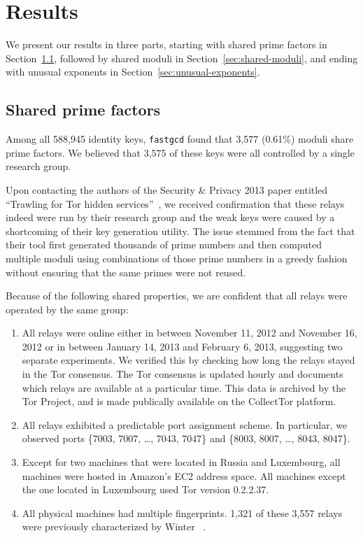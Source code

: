 \section{Results}
\label{sec:results}
We present our results in three parts, starting with shared prime factors in
Section~\ref{sec:shared-primes}, followed by shared moduli in
Section~\ref{sec:shared-moduli}, and ending with unusual exponents 
in Section~\ref{sec:unusual-exponents}.

\subsection{Shared prime factors}
\label{sec:shared-primes}
Among all 588,945 identity keys, \texttt{fastgcd} found that 3,577 (0.61\%) 
moduli share prime factors.  We believed that 3,575 of these keys 
were all controlled by a single research group.  

Upon contacting the authors of the Security \& Privacy 2013 paper entitled
``Trawling for Tor hidden services''~\cite{Biryukov2013a}, we received
confirmation that these relays indeed were run by their research group and the
weak keys were caused by a shortcoming of their key generation utility. The
issue stemmed from the fact that their tool first generated thousands of prime
numbers and then computed multiple moduli using combinations of those prime
numbers in a greedy fashion without ensuring that the same primes were not
reused.

Because of the following shared properties, we are confident that all relays
were operated by the same group:

\begin{enumerate}
	\item All relays were online either in between November 11, 2012 and
		November 16, 2012 or in between January 14, 2013 and February 6, 2013,
		suggesting two separate experiments. We verified this by checking how long the relays stayed in the Tor consensus. The Tor consensus is updated hourly and documents which relays are available at a particular time. This data is archived by the Tor Project, and is made publically available on the CollectTor platform.

	\item All relays exhibited a predictable port assignment scheme.  In
		particular, we observed ports \{7003, 7007, \dots, 7043, 7047\} and
		\{8003, 8007, \dots, 8043, 8047\}.

	\item Except for two machines that were located in Russia and Luxembourg,
		all machines were hosted in Amazon's EC2 address space.  All machines
		except the one located in Luxembourg used Tor version 0.2.2.37.

	\item All physical machines had multiple fingerprints.  1,321 of these 3,557 relays were previously characterized by Winter \ea~\cite[\S~5.1]{Winter2016a}.
\end{enumerate}

